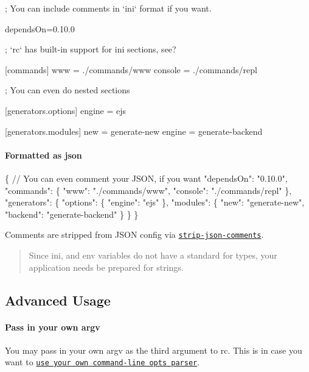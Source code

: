 \begin{DoxyCode}
; You can include comments in `ini` format if you want.

dependsOn=0.10.0


; `rc` has built-in support for ini sections, see?

[commands]
  www     = ./commands/www
  console = ./commands/repl


; You can even do nested sections

[generators.options]
  engine  = ejs

[generators.modules]
  new     = generate-new
  engine  = generate-backend
\end{DoxyCode}


\paragraph*{Formatted as {\ttfamily json}}


\begin{DoxyCode}
\{
  // You can even comment your JSON, if you want
  "dependsOn": "0.10.0",
  "commands": \{
    "www": "./commands/www",
    "console": "./commands/repl"
  \},
  "generators": \{
    "options": \{
      "engine": "ejs"
    \},
    "modules": \{
      "new": "generate-new",
      "backend": "generate-backend"
    \}
  \}
\}
\end{DoxyCode}


Comments are stripped from J\+S\+ON config via \href{https://github.com/sindresorhus/strip-json-comments}{\tt strip-\/json-\/comments}.

\begin{quote}
Since ini, and env variables do not have a standard for types, your application needs be prepared for strings. \end{quote}


\subsection*{Advanced Usage}

\paragraph*{Pass in your own {\ttfamily argv}}

You may pass in your own {\ttfamily argv} as the third argument to {\ttfamily rc}. This is in case you want to \href{https://github.com/dominictarr/rc/pull/12}{\tt use your own command-\/line opts parser}.


